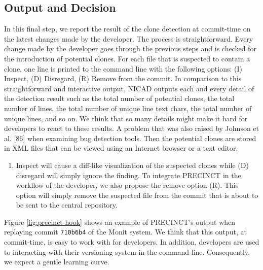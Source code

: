 \documentclass[12pt]{report}
\providecommand{\tightlist}{%
  \setlength{\itemsep}{0pt}\setlength{\parskip}{0pt}}
\begin{document}
\subsection{Output and Decision}\label{output-and-decision}

In this final step, we report the result of the clone detection at
commit-time on the latest changes made by the developer. The process is
straightforward. Every change made by the developer goes through the
previous steps and is checked for the introduction of potential clones.
For each file that is suspected to contain a clone, one line is printed
to the command line with the following options: (I) Inspect, (D)
Disregard, (R) Remove from the commit. In comparison to this
straightforward and interactive output, NICAD outputs each and every
detail of the detection result such as the total number of potential
clones, the total number of lines, the total number of unique line text
chars, the total number of unique lines, and so on. We think that so
many details might make it hard for developers to react to these
results. A problem that was also raised by Johnson et al. {[}86{]} when
examining bug detection tools. Then the potential clones are stored in
XML files that can be viewed using an Internet browser or a text editor.

\begin{enumerate}
\def\labelenumi{(\Roman{enumi})}
\tightlist
\item
  Inspect will cause a diff-like visualization of the suspected clones
  while (D) disregard will simply ignore the finding. To integrate
  PRECINCT in the workflow of the developer, we also propose the remove
  option (R). This option will simply remove the suspected file from the
  commit that is about to be sent to the central repository.
\end{enumerate}

Figure \ref{fig:precinct-hook} shows an example of PRECINCT's output
when replaying commit \lstinline!710b6b4! of the Monit system. We think
that this output, at commit-time, is easy to work with for developers.
In addition, developers are used to interacting with their versioning
system in the command line. Consequently, we expect a gentle learning
curve.
\end{document}
